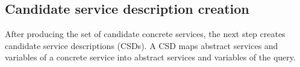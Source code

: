 %



\subsection{Candidate service description creation}

After producing the set of candidate concrete services, the next step 
creates candidate service descriptions (CSDs). 
A CSD maps abstract services and variables of a concrete service into abstract 
services and variables of the query. 

